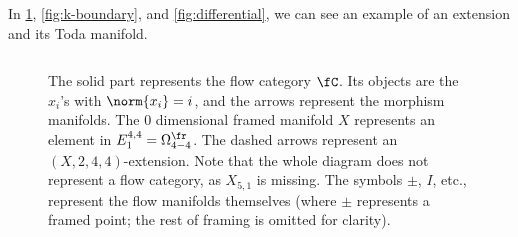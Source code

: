 \begin{exmp*}
    In \cref{fig:ffCat}, \ref{fig:k-boundary}, and \ref{fig:differential}, we can see an example of an extension and its Toda manifold.
\end{exmp*}

\begin{figure}[h!]
\[

\]
\caption{
The solid part represents the flow category $\fC$. Its objects are the $x_i$'s with $\norm{x_i}=i$, and the arrows represent the morphism manifolds.
The 0 dimensional framed manifold $X$ represents an element in $E_1^{4,4} = \Omega^{\fr}_{4-4}$.
The dashed arrows represent an $(X,2,4,4)$-extension.
Note that the whole diagram does not represent a flow category, as $X_{5,1}$ is missing.
The symbols $\pm$, $I$, etc., represent the flow manifolds themselves (where $\pm$ represents a framed point; the rest of framing is omitted for clarity).
}\label{fig:ffCat}
\end{figure}

